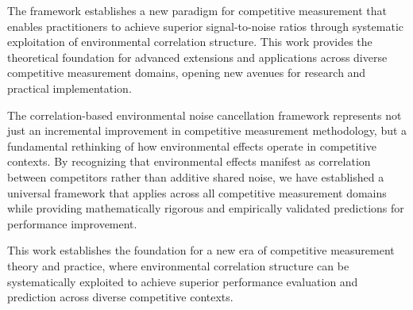 The framework establishes a new paradigm for competitive measurement that enables practitioners to achieve superior signal-to-noise ratios through systematic exploitation of environmental correlation structure. This work provides the theoretical foundation for advanced extensions and applications across diverse competitive measurement domains, opening new avenues for research and practical implementation.

The correlation-based environmental noise cancellation framework represents not just an incremental improvement in competitive measurement methodology, but a fundamental rethinking of how environmental effects operate in competitive contexts. By recognizing that environmental effects manifest as correlation between competitors rather than additive shared noise, we have established a universal framework that applies across all competitive measurement domains while providing mathematically rigorous and empirically validated predictions for performance improvement.

This work establishes the foundation for a new era of competitive measurement theory and practice, where environmental correlation structure can be systematically exploited to achieve superior performance evaluation and prediction across diverse competitive contexts.
